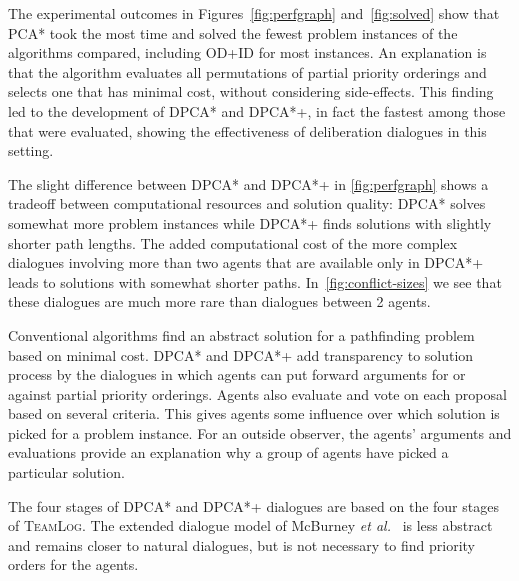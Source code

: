 
The experimental outcomes in Figures~\ref{fig:perfgraph} and~\ref{fig:solved} show that PCA* took the most 
time and solved the fewest problem instances of the algorithms compared, including OD+ID for most instances. An explanation is that the algorithm 
evaluates all permutations of partial priority orderings and selects one that has
minimal cost, without considering side-effects. This finding led to the development of DPCA* and DPCA*+, in fact the fastest among those that were evaluated, showing the effectiveness of deliberation 
dialogues in this setting.

The slight difference between DPCA* and DPCA*+ in \autoref{fig:perfgraph} shows a tradeoff between computational resources and solution quality: DPCA* solves somewhat more problem 
instances while DPCA*+ finds solutions with slightly shorter path lengths.
The added computational cost of the more complex dialogues involving more than two agents that are available only in DPCA*+ leads to solutions with somewhat shorter paths. In~\autoref{fig:conflict-sizes} we see that these dialogues are much more rare than dialogues between 2 agents. 

Conventional algorithms find an abstract solution for a pathfinding problem based on minimal cost. DPCA* and DPCA*+ add transparency to solution process by the dialogues in which agents can put forward arguments for or against 
partial 
priority orderings. Agents also evaluate and vote on each proposal based on several 
criteria. This gives agents some influence over which solution 
is picked for a problem instance. For an outside observer, the agents' arguments and evaluations provide an explanation why a group of agents have picked a particular 
solution. 

The four stages of DPCA* and DPCA*+ dialogues are based on the 
four stages of \textsc{TeamLog}. The extended dialogue model of 
McBurney \emph{et al.}~\cite{mcburney2007} is less abstract and remains closer 
to natural dialogues, but is not necessary to find 
priority orders for the agents. 

